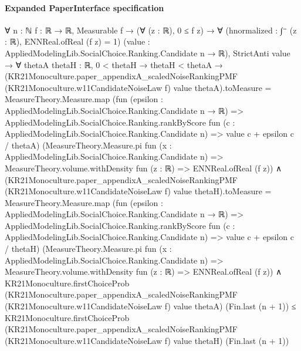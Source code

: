 \documentclass[10pt]{article}
\begin{document}
\paragraph{Expanded PaperInterface specification}
\begin{ReviewVerbatim}
∀ {n : ℕ} {f : ℝ → ℝ},
  Measurable f →
    (∀ (z : ℝ), 0 ≤ f z) →
      ∀ (hnormalized : ∫⁻ (z : ℝ), ENNReal.ofReal (f z) = 1)
        (value : AppliedModelingLib.SocialChoice.Ranking.Candidate n → ℝ),
        StrictAnti value →
          ∀ {thetaA thetaH : ℝ},
            0 < thetaH →
              thetaH < thetaA →
                (KR21Monoculture.paper_appendixA_scaledNoiseRankingPMF (KR21Monoculture.w11CandidateNoiseLaw f) value
                        thetaA).toMeasure =
                    MeasureTheory.Measure.map
                      (fun (epsilon : AppliedModelingLib.SocialChoice.Ranking.Candidate n → ℝ) =>
                        AppliedModelingLib.SocialChoice.Ranking.rankByScore
                          fun (c : AppliedModelingLib.SocialChoice.Ranking.Candidate n) => value c + epsilon c / thetaA)
                      (MeasureTheory.Measure.pi fun (x : AppliedModelingLib.SocialChoice.Ranking.Candidate n) =>
                        MeasureTheory.volume.withDensity fun (z : ℝ) => ENNReal.ofReal (f z)) ∧
                  (KR21Monoculture.paper_appendixA_scaledNoiseRankingPMF (KR21Monoculture.w11CandidateNoiseLaw f) value
                          thetaH).toMeasure =
                      MeasureTheory.Measure.map
                        (fun (epsilon : AppliedModelingLib.SocialChoice.Ranking.Candidate n → ℝ) =>
                          AppliedModelingLib.SocialChoice.Ranking.rankByScore
                            fun (c : AppliedModelingLib.SocialChoice.Ranking.Candidate n) =>
                            value c + epsilon c / thetaH)
                        (MeasureTheory.Measure.pi fun (x : AppliedModelingLib.SocialChoice.Ranking.Candidate n) =>
                          MeasureTheory.volume.withDensity fun (z : ℝ) => ENNReal.ofReal (f z)) ∧
                    KR21Monoculture.firstChoiceProb
                        (KR21Monoculture.paper_appendixA_scaledNoiseRankingPMF (KR21Monoculture.w11CandidateNoiseLaw f)
                          value thetaA)
                        (Fin.last (n + 1)) ≤
                      KR21Monoculture.firstChoiceProb
                        (KR21Monoculture.paper_appendixA_scaledNoiseRankingPMF (KR21Monoculture.w11CandidateNoiseLaw f)
                          value thetaH)
                        (Fin.last (n + 1))
\end{ReviewVerbatim}
\end{document}
